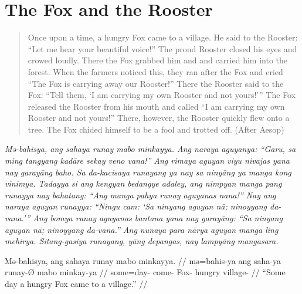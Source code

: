 \section{The Fox and the Rooster}

\citep[Adapted from][]{becker:uebersetzungsaufgabe}\medskip

\blockquote{Once upon a time, a hungry Fox came to a village. He said to the
Rooster: \enquote{Let me hear your beautiful voice!} The proud Rooster closed
his eyes and crowed loudly. There the Fox grabbed him and and carried him into
the forest. When the farmers noticed this, they ran after the Fox and cried
\enquote{The Fox is carrying away our Rooster!} There the Rooster said to the
Fox: \enquote{Tell them, \enquote{I am carrying my own Rooster and not yours!}}
The Fox released the Rooster from his mouth and called \enquote{I am carrying
my own Rooster and not yours!} There, however, the Rooster quickly flew onto a
tree. The Fox chided himself to be a fool and trotted off. (After Aesop)}

\medskip

{\itshape \noindent Mə-bahisya, ang sahaya runay mabo minkayya. Ang naraya
aguyanya: \enquote{Garu, sa ming tangyang kadāre sekay veno vana!} Ang rimaya
aguyan viyu nivajas yana nay garayāng baho. Sa da-kacisaya runayang ya nay sa
ninyāng ya manga kong vi\-nim\-ya. Tadayya si ang kengyan bedangye adaley, ang
nimpyan manga pang runayya nay bahatang: \enquote{Ang manga pahya runay
aguyanas nana!} Nay ang naraya aguyan runayya: \enquote{Ningu cam: \enquote{Sa
ninyang aguyan nā; ninoyyang da-vana.}} Ang bomya runay aguyanas bantana yana
nay garayāng: \enquote{Sa ninyang aguyan nā; ninoyyang da-vana.} Ang nunaya
para nārya aguyan manga ling mehirya. Sitang-gasiya runayang, yāng depangas,
nay lampyāng mangasara.}\medskip

\pex %
\a\begingl
	\gla Mə-bahisya, ang sahaya runay mabo minkayya. //
	\glb mə=bahis-ya ang saha-ya runay-Ø mabo minkay-ya //
	\glc some=day-\Loc{} \AgtT{} come-\TsgM{} Fox-\Top{} hungry village-\Loc{} //
	\glft \enquote{Some day a hungry Fox came to a village.} //
\endgl

